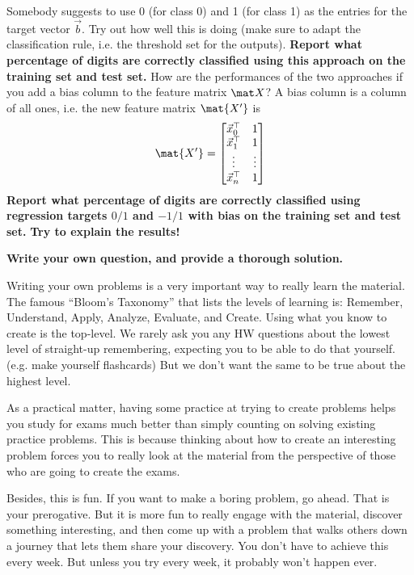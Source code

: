 \documentclass[preview]{standalone}
\begin{document}
\begin{Parts}
\Part Somebody suggests to use 0 (for class 0) and 1 (for class 1) as the
entries for the target vector $\vec b$. Try out how well this is doing
(make sure to adapt the classification rule, i.e. the threshold set for the outputs).
\textbf{Report what percentage of digits
are correctly classified using this approach on the training set and test set.}
How are the performances of the two approaches if you add a bias column
to the feature matrix $\mat X$? A bias column is a column of all ones, i.e. the new
feature matrix $\mat{X'}$ is
$$\mat{X'} = \begin{bmatrix}\vec{x}_0^\top & 1\\\vec{x}_1^\top & 1\\ \vdots & \vdots \\ \vec{x}_n^\top & 1 \end{bmatrix}$$
\textbf{Report what percentage of digits
are correctly classified using regression targets $0/1$ and $-1/1$ with bias on the training set and test set.}
\textbf{Try to explain the results!}





\end{Parts}


{\bf Write your own question, and provide a thorough solution.}

Writing your own problems is a very important way to really learn
the material. The famous ``Bloom's Taxonomy'' that lists the levels of
learning is: Remember, Understand, Apply, Analyze, Evaluate, and
Create. Using what you know to create is the top-level. We rarely ask
you any HW questions about the lowest level of straight-up
remembering, expecting you to be able to do that yourself. (e.g. make
yourself flashcards) But we don't want the same to be true about the
highest level.

As a practical matter, having some practice at trying to create
problems helps you study for exams much better than simply counting on
solving existing practice problems. This is because thinking about how
to create an interesting problem forces you to really look at the
material from the perspective of those who are going to create the
exams. 

Besides, this is fun. If you want to make a boring problem, go
ahead. That is your prerogative. But it is more fun to really engage
with the material, discover something interesting, and then come up
with a problem that walks others down a journey that lets them share
your discovery. You don't have to achieve this every week. But unless
you try every week, it probably won't happen ever. 
\end{document}
